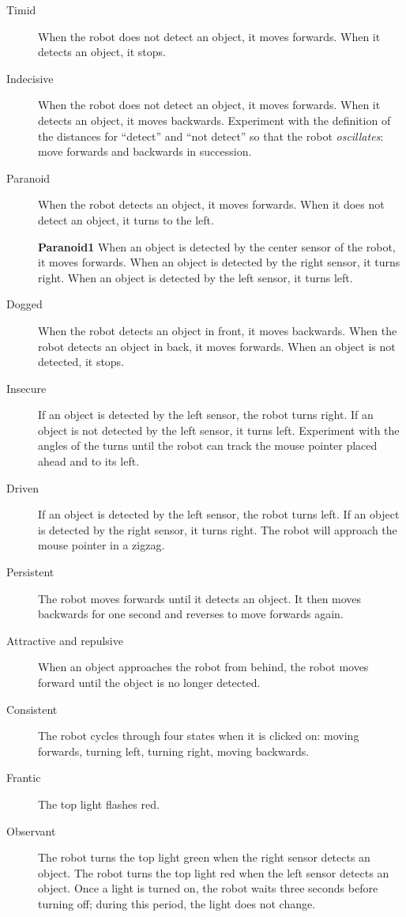 \begin{description}

\item[Timid] When the robot does not detect an object, it moves forwards.
When it detects an object, it stops.

\item[Indecisive] When the robot does not detect an object, it moves
forwards. When it detects an object, it moves backwards. Experiment with
the definition of the distances for ``detect'' and ``not detect'' so
that the robot \emph{oscillates}: move forwards and backwards in
succession.

\item[Paranoid] When the robot detects an object, it moves forwards. When
it does not detect an object, it turns to the left.

\textbf{Paranoid1} When an object is detected by the center sensor of
the robot, it moves forwards. When an object is detected by the right
sensor, it turns right. When an object is detected by the left sensor,
it turns left.

\item[Dogged] When the robot detects an object in front, it moves
backwards. When the robot detects an object in back, it moves forwards.
When an object is not detected, it stops.

\item[Insecure] If an object is detected by the left sensor, the robot
turns right. If an object is not detected by the left sensor, it turns
left. Experiment with the angles of the turns until the robot can track
the mouse pointer placed ahead and to its left.

\item[Driven] If an object is detected by the left sensor, the robot
turns left. If an object is detected by the right sensor, it turns
right. The robot will approach the mouse pointer in a zigzag.

\item[Persistent] The robot moves forwards until it detects an object.
It then moves backwards for one second and reverses to move forwards
again.

\item[Attractive and repulsive] When an object approaches the robot from
behind, the robot moves forward until the object is no longer detected.

\item[Consistent] The robot cycles through four states when it is
clicked on: moving forwards, turning left, turning right, moving
backwards.

\item[Frantic] The top light flashes red.

\item[Observant] The robot turns the top light green when the right
sensor detects an object. The robot turns the top light red when the
left sensor detects an object. Once a light is turned on, the robot
waits three seconds before turning off; during this period, the light
does not change.

\end{description}

